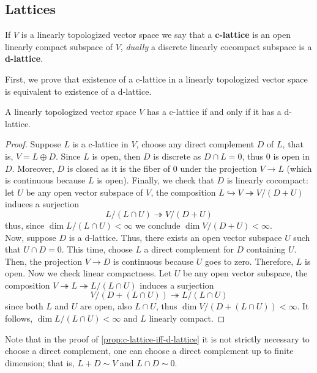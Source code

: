 \subsection*{Lattices}
\begin{definition}\label{def:c-lattice}
	If $V$ is a linearly topologized vector space we say that a \textbf{c-lattice} is an open linearly compact subspace of $V$, \textit{dually} a discrete linearly cocompact subspace is a \textbf{d-lattice}.
\end{definition}
First, we prove that existence of a c-lattice in a linearly topologized vector space is equivalent to existence of a d-lattice.
\begin{proposition}\label{prop:c-lattice-iff-d-lattice}
	A linearly topologized vector space $V$ has a c-lattice if and only if it has a d-lattice. 
\end{proposition}
\begin{proof}
	Suppose $L$ is a c-lattice in $V$, choose any direct complement $D$ of $L$, that is, $V = L \oplus D$. Since $L$ is open, then $D$ is discrete as $D\cap L = 0$, thus ${0}$ is open in $D$. Moreover, $D$ is closed as it is the fiber of $0$ under the projection $V \to L$ (which is continuous because $L$ is open). Finally, we check that $D$ is linearly cocompact: let $U$ be any open vector subspace of $V$, the composition $L \hookrightarrow V \twoheadrightarrow V/(D+U)$ induces a surjection 
	\[
		L/(L \cap U) \twoheadrightarrow V/(D+U)
	\]
	thus, since $\dim L / (L \cap U) < \infty$ we conclude $\dim V/(D+U) < \infty$. \\
	Now, suppose $D$ is a d-lattice. Thus, there exists an open vector subspace $U$ such that $U \cap D = 0$. This time, choose $L$ a direct complement for $D$ containing $U$. Then, the projection $V \to D$ is continuous because $U$ goes to zero. Therefore, $L$ is open. Now we check linear compactness. Let $U$ be any open vector subspace, the composition $V \twoheadrightarrow L \twoheadrightarrow L/(L \cap U)$ induces a surjection
	 \[
	 	V/(D + (L \cap U)) \twoheadrightarrow L/(L \cap U)
	 \]
	 since both $L$ and $U$ are open, also $L\cap U$, thus $\dim V/(D + (L \cap U)) < \infty$. It follows, $\dim L/(L \cap U) < \infty$ and $L$ linearly compact.  
\end{proof}
\begin{remark}\label{up-to-finite-dimension}
	Note that in the proof of \cref{prop:c-lattice-iff-d-lattice} it is not strictly necessary to choose a direct complement, one can choose a direct complement up to finite dimension; that is, $L + D \sim V$ and $L \cap D \sim 0$. 
\end{remark}
